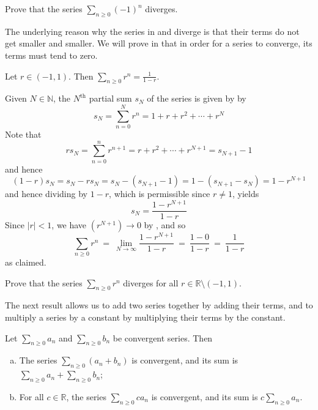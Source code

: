 \begin{exercise}
\label{exAlternatingSeriesOfOneDiverges}
Prove that the series $\sum_{n \ge 0} (-1)^n$ diverges.
\end{exercise}

The underlying reason why the series in  and  diverge is that their terms do not get smaller and smaller. We will prove in  that in order for a series to converge, its terms must tend to zero.

\begin{theorem}
\label{thmGeometricSeries}
Let $r \in (-1, 1)$. Then $\displaystyle\sum_{n \ge 0} r^n = \frac{1}{1-r}$.
\end{theorem}

\begin{cproof}
Given $N \in \mathbb{N}$, the $N^{\text{th}}$ partial sum $s_N$ of the series is given by by
\[ s_N = \sum_{n=0}^N r^n = 1 + r + r^2 + \cdots + r^N \]
Note that
\[ rs_N = \sum_{n=0}^n r^{n+1} = r+r^2+\cdots+r^{N+1} = s_{N+1}-1 \]
and hence
\[ (1-r)s_N = s_N-rs_N = s_N-(s_{N+1}-1) = 1-(s_{N+1}-s_N) = 1-r^{N+1} \]
and hence dividing by $1-r$, which is permissible since $r \ne 1$, yields
\[ s_N = \frac{1-r^{N+1}}{1-r} \]
Since $|r|<1$, we have $(r^{N+1}) \to 0$ by , and so
\[ \sum_{n \ge 0} r^n ~=~ \lim_{N \to \infty} \frac{1-r^{N+1}}{1-r} ~=~ \frac{1-0}{1-r} ~=~ \frac{1}{1-r} \]
as claimed.
\end{cproof}

\begin{exercise}
Prove that the series $\displaystyle \sum_{n \ge 0} r^n$ diverges for all $r \in \mathbb{R} \setminus (-1,1)$.
\end{exercise}

The next result allows us to add two series together by adding their terms, and to multiply a series by a constant by multiplying their terms by the constant.

\begin{theorem}
\label{thmLinearityOfSummation}
Let $\displaystyle \sum_{n \ge 0} a_n$ and $\displaystyle \sum_{n \ge 0} b_n$ be convergent series. Then
\begin{enumerate}[(a)]
\item The series $\displaystyle \sum_{n \ge 0} (a_n+b_n)$ is convergent, and its sum is $\displaystyle \sum_{n \ge 0} a_n + \sum_{n \ge 0} b_n$;
\item For all $c \in \mathbb{R}$, the series $\displaystyle \sum_{n \ge 0} c a_n$ is convergent, and its sum is $\displaystyle c \sum_{n \ge 0} a_n$.
\end{enumerate}
\end{theorem}

